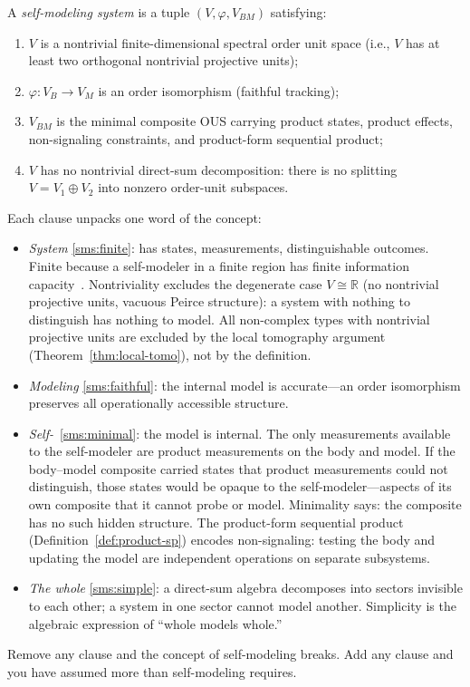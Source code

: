 \documentclass[11pt]{article}
\begin{document}
\begin{definition}\label{def:self-modeling-system}
  A \emph{self-modeling system} is a tuple $(V, \varphi, V_{BM})$
  satisfying:
  \begin{enumerate}[label=(\roman*)]
    \item\label{sms:finite} $V$ is a nontrivial finite-dimensional
      spectral order unit space (i.e., $V$ has at least two
      orthogonal nontrivial projective units);
    \item\label{sms:faithful} $\varphi: V_{B} \to V_{M}$ is an
      order isomorphism (faithful tracking);
    \item\label{sms:minimal} $V_{BM}$ is the minimal composite OUS
      carrying product states, product effects, non-signaling
      constraints, and product-form sequential product;
    \item\label{sms:simple} $V$ has no nontrivial direct-sum
      decomposition: there is no splitting $V = V_1 \oplus V_2$ into
      nonzero order-unit subspaces.
  \end{enumerate}
\end{definition}

Each clause unpacks one word of the concept:
\begin{itemize}[nosep]
  \item \emph{System} \ref{sms:finite}: has states, measurements,
    distinguishable outcomes.  Finite because a self-modeler in a
    finite region has finite information
    capacity~\cite{Bekenstein1981}.  Nontriviality excludes the
    degenerate case $V \cong \mathbb{R}$ (no nontrivial projective
    units, vacuous Peirce structure): a system with nothing to
    distinguish has nothing to model.  All non-complex types with
    nontrivial projective units are excluded by the local
    tomography argument (Theorem~\ref{thm:local-tomo}), not by the
    definition.
  \item \emph{Modeling} \ref{sms:faithful}: the internal model is
    accurate---an order isomorphism preserves all operationally
    accessible structure.
  \item \emph{Self-}\ \ref{sms:minimal}: the model is internal.
    The only measurements available to the self-modeler are product
    measurements on the body and model.  If the body--model composite
    carried states that product measurements could not distinguish,
    those states would be opaque to the self-modeler---aspects of its
    own composite that it cannot probe or model.  Minimality says:
    the composite has no such hidden structure.  The product-form
    sequential product (Definition~\ref{def:product-sp}) encodes
    non-signaling: testing the body and updating the model are
    independent operations on separate subsystems.
  \item \emph{The whole} \ref{sms:simple}: a direct-sum algebra
    decomposes into sectors invisible to each other; a system in one
    sector cannot model another.  Simplicity is the algebraic
    expression of ``whole models whole.''
\end{itemize}
Remove any clause and the concept of self-modeling breaks.  Add any
clause and you have assumed more than self-modeling requires.
\end{document}
